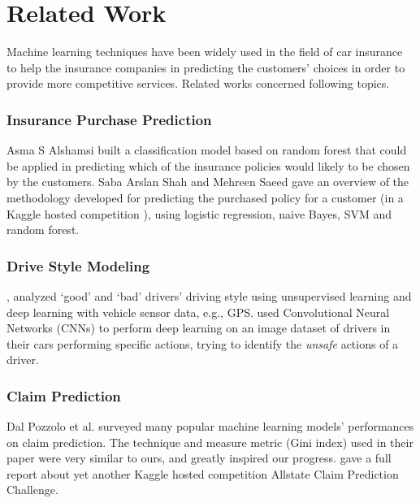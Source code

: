 \documentclass{standalone}
\begin{document}
\section{Related Work}

Machine learning techniques have been widely used in the field of car insurance to help the insurance companies in predicting the customers' choices in order to provide more competitive services. Related works concerned following topics.

\subsubsection{Insurance Purchase Prediction}

Asma S Alshamsi \cite{alshamsi2014predicting} built a classification model based on random forest that could be applied in predicting which of the insurance policies would likely to be chosen by the customers. Saba Arslan Shah and Mehreen Saeed \cite{shahpredicting} gave an overview of the methodology developed for predicting the purchased policy for a
customer (in a Kaggle hosted competition \cite{kaggle:allstatepurchase}), using logistic regression, naive Bayes, SVM and random forest.

\subsubsection{Drive Style Modeling}
\cite{dong2016characterizing}, \cite{nikulin2016driving} analyzed `good' and `bad' drivers' driving style using unsupervised learning and deep learning with vehicle
sensor data, e.g., GPS.
\cite{singhusing} used Convolutional Neural Networks
(CNNs) to perform deep learning on an image dataset  of drivers in their
cars performing specific actions, trying to identify the \emph{unsafe} actions of a driver.

\subsubsection{Claim Prediction}

Dal Pozzolo et al. \cite{dal2010comparison} surveyed many popular machine learning models' performances on claim prediction. The technique and measure metric (Gini index) used in their paper were very similar to ours, and greatly inspired our progress. \cite{huangfu2015data} gave a full report about yet another Kaggle hosted competition Allstate Claim Prediction Challenge\cite{kaggle:allstate}.
\end{document}
